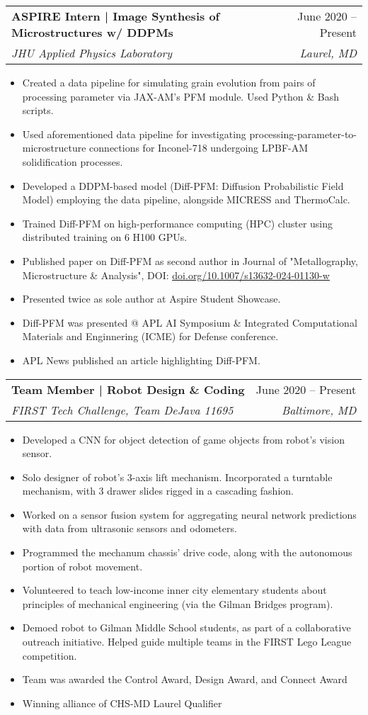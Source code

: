 \documentclass[letterpaper,11pt]{article}
\makeatletter
\newcommand{\resumeItem}[1]{
  \item\small{
    {#1 \vspace{-2pt}}
  }
}
\newcommand{\resumeSubheading}[4]{
  \vspace{-2pt}\item
    \begin{tabular*}{0.97\textwidth}[t]{l@{\extracolsep{\fill}}r}
      \textbf{#1} & #2 \\
      \textit{\small#3} & \textit{\small #4} \\
    \end{tabular*}\vspace{-7pt}
}
\newcommand{\resumeItemListStart}{\begin{itemize}}
\newcommand{\resumeItemListEnd}{\end{itemize}\vspace{-5pt}}
\makeatother
\begin{document}
    \resumeSubheading
      {ASPIRE Intern | Image Synthesis of Microstructures w/ DDPMs}{June 2020 -- Present}
      {JHU Applied Physics Laboratory}{Laurel, MD}
      \resumeItemListStart
      \resumeItem{Created a data pipeline for simulating grain evolution from pairs of processing parameter via JAX-AM's PFM module. Used Python \& Bash scripts.}
      \resumeItem{Used aforementioned data pipeline for investigating processing-parameter-to-microstructure connections for Inconel-718 undergoing LPBF-AM solidification processes.}
        \resumeItem{Developed a DDPM-based model (Diff-PFM: Diffusion Probabilistic Field Model) employing the data pipeline, alongside MICRESS and ThermoCalc.}
        \resumeItem{Trained Diff-PFM on high-performance computing (HPC) cluster using distributed training on 6 H100 GPUs.}
        \resumeItem{Published paper on Diff-PFM as second author in Journal of "Metallography, Microstructure \& Analysis", DOI: \href{https://doi.org/10.1007/s13632-024-01130-w}{\underline{doi.org/10.1007/s13632-024-01130-w}}}
        \resumeItem{Presented twice as sole author at Aspire Student Showcase.}
        \resumeItem{Diff-PFM was presented @ APL AI Symposium \& Integrated Computational Materials and Enginnering (ICME) for Defense conference.}
        \resumeItem{APL News published an article highlighting Diff-PFM.}
      \resumeItemListEnd
    \resumeSubheading
    {Team Member | Robot Design \& Coding}{June 2020 -- Present}
      {FIRST Tech Challenge, Team DeJava 11695}{Baltimore, MD}
      \resumeItemListStart
      \resumeItem{Developed a CNN for object detection of game objects from robot's vision sensor.}
      \resumeItem{Solo designer of robot's 3-axis lift mechanism. Incorporated a turntable mechanism, with 3 drawer slides rigged in a cascading fashion.}
      \resumeItem{Worked on a sensor fusion system for aggregating neural network predictions with data from ultrasonic sensors and odometers.}
      \resumeItem{Programmed the mechanum chassis' drive code, along with the autonomous portion of robot movement.}
      \resumeItem{Volunteered to teach low-income inner city elementary students about principles of mechanical engineering (via the Gilman Bridges program).}
      \resumeItem{Demoed robot to Gilman Middle School students, as part of a collaborative outreach initiative. Helped guide multiple teams in the FIRST Lego League competition.}
      \resumeItem{Team was awarded the Control Award, Design Award, and Connect Award}
      \resumeItem{Winning alliance of CHS-MD Laurel Qualifier}
      \resumeItemListEnd
\end{document}
